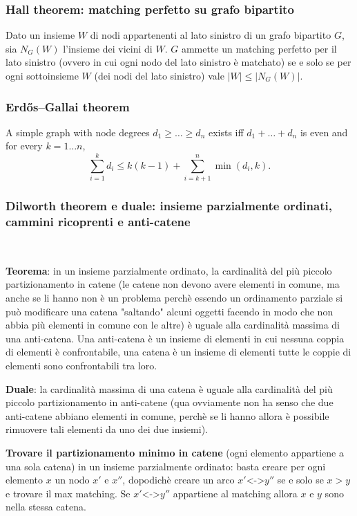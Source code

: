 \subsubsection{Hall theorem: matching perfetto su grafo bipartito}
Dato un insieme $W$ di nodi appartenenti al lato sinistro di un grafo bipartito $G$, sia $N_G(W)$ l'insieme dei vicini di $W$. $G$ ammette un matching perfetto per il lato sinistro (ovvero in cui ogni nodo del lato sinistro è matchato) se e solo se per ogni sottoinsieme $W$ (dei nodi del lato sinistro) vale $|W|\leq|N_G(W)|$.

\subsubsection{Erdős–Gallai theorem}
		A simple graph with node degrees $d_1 \ge \dots \ge d_n$ exists iff $d_1 + \dots + d_n$ is even and for every $k = 1\dots n$,
		\[ \sum _{i=1}^{k}d_{i}\leq k(k-1)+\sum _{i=k+1}^{n}\min(d_{i},k). \]

\subsubsection{Dilworth theorem e duale: insieme parzialmente ordinati, cammini ricoprenti e anti-catene}
\,

\textbf{Teorema}: in un insieme parzialmente ordinato, la cardinalità del più piccolo partizionamento in catene (le catene non devono avere elementi in comune, ma anche se li hanno 
non è un problema perchè essendo un ordinamento parziale si può modificare una catena  "saltando" alcuni oggetti facendo in modo che non abbia più elementi in comune con le altre) è
uguale alla cardinalità massima di una anti-catena. Una anti-catena è un insieme di elementi in cui nessuna coppia di elementi è confrontabile, una catena è un insieme di elementi 
tutte le coppie di elementi sono  confrontabili tra loro. 

\textbf{Duale}: la cardinalità massima di una catena è uguale alla cardinalità del più piccolo partizionamento in anti-catene (qua 
ovviamente non ha senso che due anti-catene abbiano elementi in comune, perchè se li hanno allora è possibile rimuovere tali elementi da uno dei due insiemi). 

\textbf{Trovare il partizionamento minimo in catene} (ogni elemento appartiene a una sola catena) in un insieme parzialmente ordinato: basta creare per ogni elemento $x$ un nodo $x'$ e $x''$, dopodichè creare un arco $x'$<->$y''$ se e solo se $x>y$ e trovare il max matching. Se
$x'$<->$y''$ appartiene al matching allora $x$ e $y$ sono nella stessa catena. 


